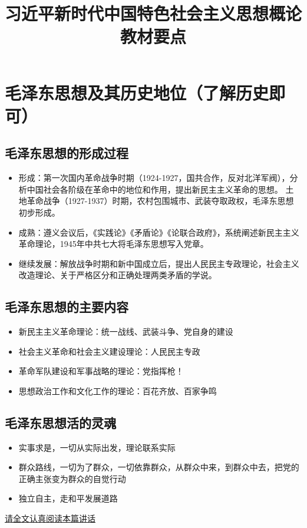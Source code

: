 \documentclass[a4paper, UTF8]{ctexart}
\title{\huge{\heiti 习近平新时代中国特色社会主义思想概论\protect\\教材要点}}
\author{}
\date{}
\begin{document}
\maketitle

\section{毛泽东思想及其历史地位（了解历史即可）}
    \subsection{毛泽东思想的形成过程}
    \begin{itemize}
        \item 形成：第一次国内革命战争时期（1924-1927，国共合作，反对北洋军阀），分析中国社会各阶级在革命中的地位和作用，提出新民主主义革命的思想。
        土地革命战争（1927-1937）时期，农村包围城市、武装夺取政权，毛泽东思想初步形成。
        \item 成熟：遵义会议后，《实践论》《矛盾论》《论联合政府》，系统阐述新民主主义革命理论，1945年中共七大将毛泽东思想写入党章。
        \item 继续发展：解放战争时期和新中国成立后，提出人民民主专政理论，社会主义改造理论、关于严格区分和正确处理两类矛盾的学说。
    \end{itemize}

    \subsection{毛泽东思想的主要内容}
    \begin{itemize}
        \item 新民主主义革命理论：统一战线、武装斗争、党自身的建设
        \item 社会主义革命和社会主义建设理论：人民民主专政
        \item 革命军队建设和军事战略的理论：党指挥枪！
        \item 思想政治工作和文化工作的理论：百花齐放、百家争鸣
    \end{itemize}

    \subsection{毛泽东思想活的灵魂}
    \begin{itemize}
        \item 实事求是，一切从实际出发，理论联系实际
        \item 群众路线，一切为了群众，一切依靠群众，从群众中来，到群众中去，把党的正确主张变为群众的自觉行动
        \item 独立自主，走和平发展道路
    \end{itemize}

    \href{http://www.xinhuanet.com//politics/2013-12/26/c_118723453.htm}{请全文认真阅读本篇讲话}
\end{document}

